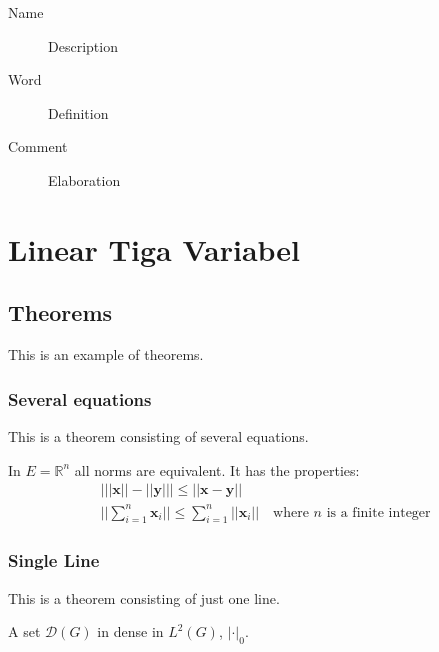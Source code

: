 \documentclass[11pt,fleqn]{book} %
\begin{document}
\begin{description}
\item[Name] Description
\item[Word] Definition
\item[Comment] Elaboration
\end{description}


\chapter{Linear Tiga Variabel}

\section{Theorems}

This is an example of theorems.

\subsection{Several equations}
This is a theorem consisting of several equations.

\begin{theorem}
In $E=\mathbb{R}^n$ all norms are equivalent. It has the properties:
\begin{align}
& \big| ||\mathbf{x}|| - ||\mathbf{y}|| \big|\leq || \mathbf{x}- \mathbf{y}||\\
&  ||\sum_{i=1}^n\mathbf{x}_i||\leq \sum_{i=1}^n||\mathbf{x}_i||\quad\text{where $n$ is a finite integer}
\end{align}
\end{theorem}

\subsection{Single Line}
This is a theorem consisting of just one line.

\begin{theorem}
A set $\mathcal{D}(G)$ in dense in $L^2(G)$, $|\cdot|_0$. 
\end{theorem}

\end{document}
